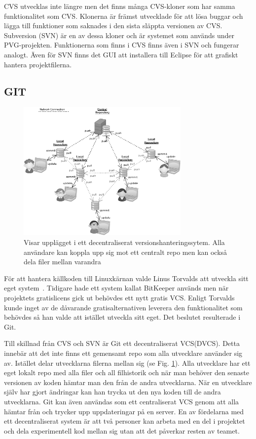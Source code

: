 	CVS utvecklas inte längre men det finns många CVS-kloner som har samma funktionalitet som CVS. Klonerna är främst utvecklade för att lösa buggar och lägga till funktioner som saknades i den sista släppta versionen av CVS. Subversion (SVN) är en av dessa kloner och är systemet som används under PVG-projekten. Funktionerna som finns i CVS finns även i SVN och fungerar analogt. Även för SVN finns det GUI att installera till Eclipse för att grafiskt hantera projektfilerna. 
 

\subsection{GIT}

\begin{figure}[htb!]\centering\includegraphics[width=0.75\textwidth]{DVCS.png}\caption{Visar upplägget i ett decentraliserat versionshanteringssytem. Alla användare kan koppla upp sig mot ett centralt repo men kan också dela filer mellan varandra}\label{fig:DVCSPic}\end{figure}


För att hantera källkoden till Linuxkärnan valde Linus Torvalds att utveckla sitt eget system~\cite{Torvalds}. Tidigare hade ett system kallat BitKeeper används men när projektets gratislicens gick ut behövdes ett nytt gratis VCS. Enligt Torvalds kunde inget av de dåvarande gratisalternativen leverera den funktionalitet som behövdes så han valde att istället utveckla sitt eget. Det beslutet resulterade i Git.

Till skillnad från CVS och SVN är Git ett decentraliserat VCS(DVCS). Detta innebär att det inte finns ett gemensamt repo som alla utvecklare använder sig av. Istället delar utvecklarna filerna mellan sig (se Fig. \ref{fig:DVCSPic}). Alla utvecklare har ett eget lokalt repo med alla filer och all filhistorik och när man behöver den senaste versionen av koden hämtar man den från de andra utvecklarna. När en utvecklare själv har gjort ändringar kan han trycka ut den nya koden till de andra utvecklarna. Git kan även användas som ett centraliserat VCS genom att alla hämtar från och trycker upp uppdateringar på en server. En av fördelarna med ett decentraliserat system är att två personer kan arbeta med en del i projektet och dela experimentell kod mellan sig utan att det påverkar resten av teamet. 

